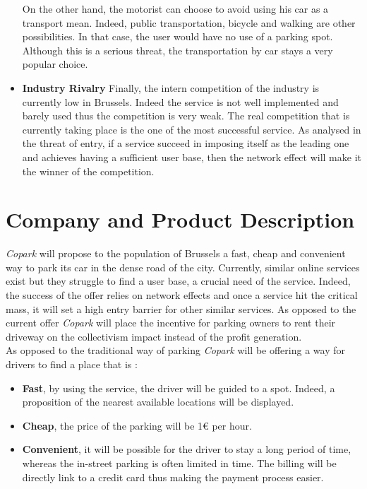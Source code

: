 \documentclass[12pt,a4paper,oneside]{book}
\newcommand{\bp}{\textit{Copark }}
\begin{document}
\begin{itemize}
On the other hand, the motorist can choose to avoid using his car as a transport mean. Indeed, public transportation, bicycle and walking are other possibilities. In that case, the user would have no use of a parking spot. Although this is a serious threat, the transportation by car stays a very popular choice.
\item \textbf{Industry Rivalry} Finally, the intern competition of the industry is currently low in Brussels. Indeed the service is not well implemented and barely used thus the competition is very weak. The real competition that is currently taking place is the one of the most successful service. As analysed in the threat of entry, if a service succeed in imposing itself as the leading one and achieves  having a sufficient user base, then the network effect will make it the winner of the competition.
\end{itemize}

\chapter{Company and Product Description}

\bp will propose to the population of Brussels a fast, cheap and convenient way to park its car in the dense road of the city. Currently, similar online services exist but they struggle to find a user base, a crucial need of the service. Indeed, the success of the offer relies on network effects and once a service hit the critical mass, it will set a high entry barrier for other similar services. As opposed to the current offer \bp will place the incentive for parking owners to rent their driveway on the collectivism impact instead of the profit generation.\\

As opposed to the traditional way of parking \bp will be offering a way for drivers to find a place that is :
\begin{itemize}
\item \textbf{Fast}, by using the service, the driver will be guided to a spot. Indeed, a proposition of the nearest available locations will be displayed.
\item \textbf{Cheap}, the price of the parking will be 1\euro{} per hour.
\item \textbf{Convenient}, it will be possible for the driver to stay a long period of time, whereas the in-street parking is often limited in time. The billing will be directly link to a credit card thus making the payment process easier.
\end{itemize} 
\end{document}
